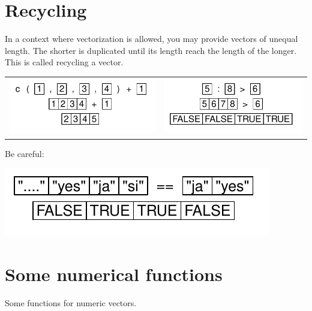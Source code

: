 \documentclass[pdflatex]{article}
\begin{document}
\section{Recycling}

In a context where vectorization is allowed, you may provide vectors of unequal length. The shorter is duplicated until its length reach the length of the longer. This is called recycling a vector.

\begin{tabular}{cc}
\includegraphics{operator_add} & \includegraphics{operator_gt}\\
\end{tabular}

Be careful:

\includegraphics{operator_recycling}

\section{Some numerical functions}

Some functions for numeric vectors.
\end{document}
